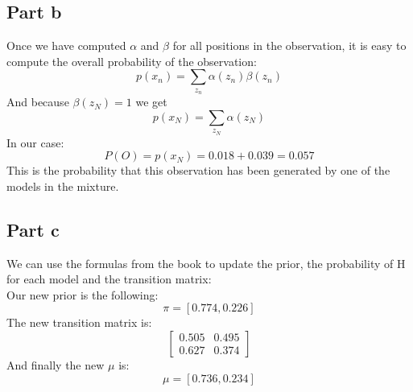 \documentclass[a4paper, 10pt]{article}
\begin{document}
\subsection{Part b}
Once we have computed $\alpha$ and $\beta$ for all positions in the observation, it is easy to compute the overall probability
of the observation:
$$
p(x_n) = \sum_{z_n} \alpha(z_n)\beta(z_n)
$$
And because $\beta(z_N) = 1$ we get
$$
p(x_N) = \sum_{z_N} \alpha(z_N)
$$
In our case:
$$
P(O) = p(x_N) = 0.018 + 0.039 = 0.057
$$
This is the probability that this observation has been generated by one of the models in the mixture.

\subsection{Part c}
We can use the formulas from the book to update the prior, the probability of H for each model 
and the transition matrix:
\\
Our new prior is the following:
$$
\pi = \left[0.774, 0.226\right]
$$
The new transition matrix is:
$$
\begin{bmatrix}
    0.505 & 0.495\\
    0.627 & 0.374
\end{bmatrix}
$$
And finally the new $\mu$ is:
$$
\mu = \left[0.736, 0.234\right]
$$
\end{document}
